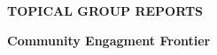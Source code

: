 

  \vfill

\begin{center}
\begin{Huge}   {\bf  TOPICAL GROUP REPORTS}

\bigskip

\bigskip

 {\bf Community Engagment Frontier }

\vfill

\vfill

\end{Huge}
\end{center}

\newpage
\thispagestyle{empty}
\mbox{\null}


